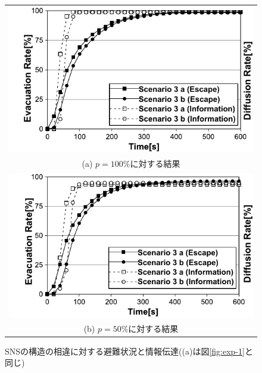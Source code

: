 \documentclass[a4j]{jarticle}
\begin{document}
\begin{figure}[h]
\centering
\begin{tabular}{c}
\includegraphics[width=\linewidth]{fig/p100-sns-20131009-1844.pdf}\\
(a) $p=100\%$に対する結果\\
\hspace{3mm}\includegraphics[width=\linewidth]{fig/p50-sns-20131009-1911.pdf}\\
(b) $p=50\%$に対する結果\\
\end{tabular}
\caption{SNSの構造の相違に対する避難状況と情報伝達((a)は図\ref{fig:exp-1}と同じ)}
\label{sns-ab}
\end{figure}

\end{document}
